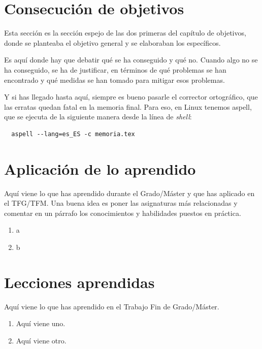 \documentclass[a4paper, 12pt]{book}
\begin{document}
\section{Consecución de objetivos}
\label{sec:consecucion-objetivos}

Esta sección es la sección espejo de las dos primeras del capítulo de objetivos, donde se planteaba el objetivo general y se elaboraban los específicos.

Es aquí donde hay que debatir qué se ha conseguido y qué no. 
Cuando algo no se ha conseguido, se ha de justificar, en términos de qué problemas se han encontrado y qué medidas se han tomado para mitigar esos problemas.

Y si has llegado hasta aquí, siempre es bueno pasarle el corrector ortográfico, que las erratas quedan fatal en la memoria final.
Para eso, en Linux tenemos aspell, que se ejecuta de la siguiente manera desde la línea de \emph{shell}:

\begin{verbatim}
  aspell --lang=es_ES -c memoria.tex
\end{verbatim}

\section{Aplicación de lo aprendido}
\label{sec:aplicacion}

Aquí viene lo que has aprendido durante el Grado/Máster y que has aplicado en el TFG/TFM. Una buena idea es poner las asignaturas más relacionadas y comentar en un párrafo los conocimientos y habilidades puestos en práctica.

\begin{enumerate}
  \item a
  \item b
\end{enumerate}


\section{Lecciones aprendidas}
\label{sec:lecciones_aprendidas}

Aquí viene lo que has aprendido en el Trabajo Fin de Grado/Máster.

\begin{enumerate}
  \item Aquí viene uno.
  \item Aquí viene otro.
\end{enumerate}
\end{document}
